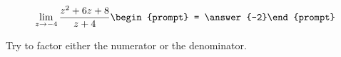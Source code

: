 \documentclass{ximera}
\author{Bart Snapp}
\begin{document}
\begin{exercise}

\[
\lim_{z\to -4 } \frac{z^2+6 z+8}{z+4}\begin{prompt} = \answer{-2}\end{prompt}
\]
\begin{hint}
Try to factor either the numerator or the denominator.
\end{hint}
\end{exercise}
\end{document}
